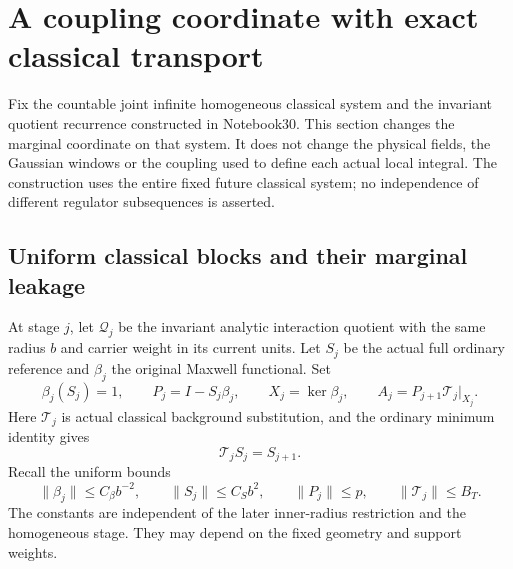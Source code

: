 \section{A coupling coordinate with exact classical transport}
\label{acc-section}

Fix the countable joint infinite homogeneous classical system and
the invariant quotient recurrence constructed in Notebook30.
This section changes the marginal coordinate on that system.
It does not change the physical fields, the Gaussian windows or
the coupling used to define each actual local integral.
The construction uses the entire fixed future classical system;
no independence of different regulator subsequences is asserted.

\subsection{Uniform classical blocks and their marginal leakage}
\label{acc-input-section}

At stage $j$, let $\mathcal Q_j$ be the invariant analytic
interaction quotient with the same radius $b$ and carrier
weight in its current units. Let $S_j$ be the actual full
ordinary reference and $\beta_j$ the original Maxwell
functional. Set
\begin{equation}
 \beta_j(S_j)=1,\qquad
 P_j=I-S_j\beta_j,\qquad
 X_j=\ker\beta_j,\qquad
 A_j=P_{j+1}\mathcal T_j\big|_{X_j}.
 \label{acc-definitions}
\end{equation}
Here $\mathcal T_j$ is actual classical background
substitution, and the ordinary minimum identity gives
\begin{equation}
                         \mathcal T_jS_j=S_{j+1}.
 \label{acc-reference-identity}
\end{equation}
Recall the uniform bounds
\begin{equation}
 \|\beta_j\|\le C_\beta b^{-2},\qquad
 \|S_j\|\le C_Sb^2,\qquad
 \|P_j\|\le p,\qquad
 \|\mathcal T_j\|\le B_T.
 \label{acc-norm-inputs}
\end{equation}
The constants are independent of the later inner-radius
restriction and the homogeneous stage. They may depend
on the fixed geometry and support weights.

